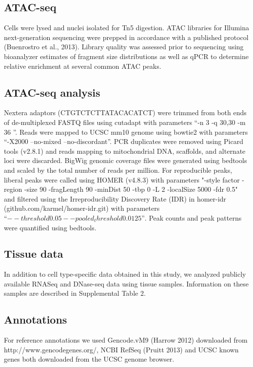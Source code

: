 \subsection{ATAC-seq}
Cells were lysed and nuclei isolated for Tn5 digestion. ATAC libraries for Illumina next-generation sequencing were prepped in accordance with a published protocol (Buenrostro et al., 2013). Library quality was assessed prior to sequencing using bioanalyzer estimates of fragment size distributions as well as qPCR to determine relative enrichment at several common ATAC peaks.

\subsection{ATAC-seq analysis}
Nextera adaptors (CTGTCTCTTATACACATCT) were trimmed from both ends of de-multiplexed FASTQ files using cutadapt with parameters “-n 3 -q 30,30 -m 36 ”. Reads were mapped to UCSC mm10 genome using bowtie2 with parameters “-X2000 --no-mixed --no-discordant”. PCR duplicates were removed using Picard tools (v2.8.1) and reads mapping to mitochondrial DNA, scaffolds, and alternate loci were discarded. BigWig genomic coverage files were generated using bedtools and scaled by the total number of reads per million. For reproducible peaks, liberal peaks were called using HOMER (v4.8.3) with parameters "-style factor -region -size 90 -fragLength 90 -minDist 50 -tbp 0 -L 2 -localSize 5000 -fdr 0.5" and filtered using the Irreproducibility Discovery Rate (IDR) in homer-idr (github.com/karmel/homer-idr.git) with parameters $“--threshold 0.05 --pooled_threshold 0.0125”$. Peak counts and peak patterns were quantified using bedtools.

\subsection{Tissue data}
In addition to cell type-specific data obtained in this study, we analyzed publicly available RNASeq and DNase-seq data using tissue samples. Information on these samples are described in Supplemental Table 2.

\subsection{Annotations}
For reference annotations we used Gencode.vM9 (Harrow 2012) downloaded from http://www.gencodegenes.org/, NCBI RefSeq (Pruitt 2013) and UCSC known genes both downloaded from the UCSC genome browser.

